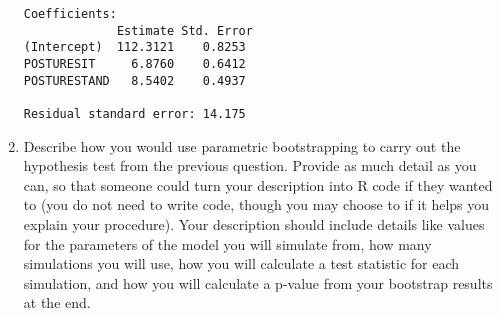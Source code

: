\documentclass[11pt]{article}
\begin{document}
\begin{enumerate}
\begin{verbatim}
Coefficients:
             Estimate Std. Error 
(Intercept)  112.3121    0.8253
POSTURESIT     6.8760    0.6412
POSTURESTAND   8.5402    0.4937

Residual standard error: 14.175
\end{verbatim}

\item Describe how you would use parametric bootstrapping to carry out the hypothesis test from the previous question. Provide as much detail as you can, so that someone could turn your description into R code if they wanted to (you do not need to write code, though you may choose to if it helps you explain your procedure). Your description should include details like values for the parameters of the model you will simulate from, how many simulations you will use, how you will calculate a test statistic for each simulation, and how you will calculate a p-value from your bootstrap results at the end.


\end{enumerate}
\end{document}
